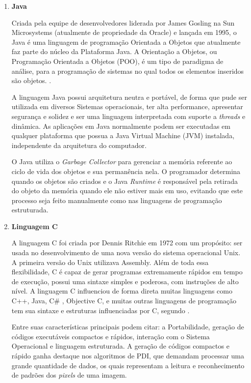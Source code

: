 \begin{enumerate}
\item \textbf{Java}

Criada pela equipe de desenvolvedores liderada por James Gosling na Sun Microsystems (atualmente de propriedade da Oracle) e lançada em 1995, o Java é uma linguagem de programação Orientada a Objetos que atualmente faz parte do núcleo da Plataforma Java. A Orientação a Objetos, ou Programação Orientada a Objetos (POO), é um tipo de paradigma de análise, para a programação de sistemas no qual todos os elementos inseridos são objetos. \cite{urma2014java}.

A linguagem Java possui arquitetura neutra e portável, de forma que pude ser utilizada em diversos Sistemas operacionais, ter alta performance, apresentar segurança e solidez e ser uma linguagem interpretada com suporte a \textit{threads} e dinâmica. As aplicações em Java normalmente podem ser executadas em qualquer plataforma que possua a Java Virtual Machine (JVM) instalada, independente da arquitetura do computador.

O Java utiliza o \textit{Garbage Collector} para gerenciar a memória referente ao ciclo de vida dos objetos e sua permanência nela. O programador determina quando os objetos são criados e o Java \textit{Runtime} é responsável pela retirada do objeto da memória quando ele não estiver mais em uso, evitando que este processo seja feito manualmente como nas linguagens de programação estruturada.


\item \textbf{Linguagem C}

A linguagem C foi criada por Dennis Ritchie em 1972 com um propósito: ser usada no desenvolvimento de uma nova versão do sistema operacional Unix. A primeira versão do Unix utilizava Assembly. Além de toda essa flexibilidade, C é capaz de gerar programas extremamente rápidos em tempo de execução, possui uma sintaxe simples e poderosa, com instruções de alto nível. A linguagem C influenciou de forma direta muitas linguagens como C++, Java, C\# , Objective C, e muitas outras linguagens de programação tem sua sintaxe e estruturas influenciadas por C, segundo .

Entre suas características principais podem citar: a Portabilidade, geração de códigos executáveis compactos e rápidos, interação com o Sistema Operacional e linguagem estruturada. A geração de códigos compactos e rápido ganha destaque nos algoritmos de PDI, que demandam processar uma grande quantidade de dados, os quais representam a leitura e reconhecimento de padrões dos \textit{pixels} de uma imagem.


\end{enumerate}
